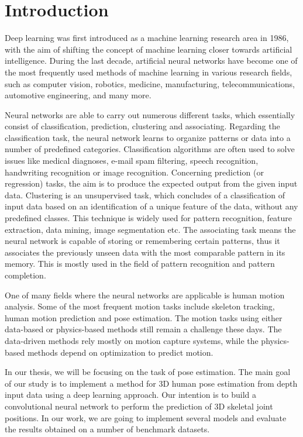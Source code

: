 \chapter{Introduction}\label{chap:intro}

Deep learning was first introduced as a machine learning research area in 1986, with the aim of shifting the concept of machine learning closer towards artificial intelligence. During the last decade, artificial neural networks have become one of the most frequently used methods of machine learning in various research fields, such as computer vision, robotics, medicine, manufacturing, telecommunications, automotive engineering, and many more.\par
\vspace{5mm}
\noindent Neural networks are able to carry out numerous different tasks, which essentially consist of classification, prediction, clustering and associating. Regarding the classification task, the neural network learns to organize patterns or data into a number of predefined categories. Classification algorithms are often used to solve issues like medical diagnoses, e-mail spam filtering, speech recognition, handwriting recognition or image recognition. Concerning prediction (or regression) tasks, the aim is to produce the expected output from the given input data. Clustering is an unsupervised task, which concludes of a classification of input data based on an identification of a unique feature of the data, without any predefined classes. This technique is widely used for pattern recognition, feature extraction, data mining, image segmentation etc. The associating task means the neural network is capable of storing or remembering certain patterns, thus it associates the previously unseen data with the most comparable pattern in its memory. This is mostly used in the field of pattern recognition and pattern completion.\par
\vspace{5mm}
\noindent One of many fields where the neural networks are applicable is human motion analysis. Some of the most frequent motion tasks include skeleton tracking, human motion prediction and pose estimation. The motion tasks using either data-based or physics-based methods still remain a challenge these days. The data-driven methods rely mostly on motion capture systems, while the physics-based methods depend on optimization to predict motion.
\par
\vspace{5mm}
\noindent 
In our thesis, we will be focusing on the task of pose estimation. The main goal of our study is to implement a method for 3D human pose estimation from depth input data using a deep learning approach. Our intention is to build a convolutional neural network to perform the prediction of 3D skeletal joint positions. In our work, we are going to implement several models and evaluate the results obtained on a number of benchmark datasets.\par

